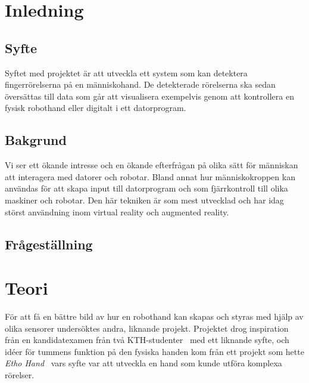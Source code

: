 \documentclass[a4paper]{article}
\begin{document}



\begin{abstract}

\end{abstract}

\begin{otherlanguage}{english}
    \begin{abstract}
    \end{abstract}
\end{otherlanguage}

\tableofcontents

\section{Inledning}
\subsection{Syfte}
Syftet med projektet är att utveckla ett system som kan detektera fingerrörelserna på en människohand.
De detekterade rörelserna ska sedan översättas till data som går att visualisera exempelvis genom att kontrollera en fysisk robothand eller digitalt i ett datorprogram.
\subsection{Bakgrund}
Vi ser ett ökande intresse och en ökande efterfrågan på olika sätt för människan att interagera med datorer och robotar. Bland annat hur människokroppen kan användas för att skapa input till datorprogram och som fjärrkontroll till olika maskiner och robotar.
Den här tekniken är som mest utvecklad och har idag störst användning inom virtual reality och augmented reality.

\subsection{Frågeställning}

\section{Teori}
För att få en bättre bild av hur en robothand kan skapas och styras med hjälp av olika sensorer undersöktes andra, liknande projekt.
Projektet drog inspiration från en kandidatexamen från två KTH-studenter~\cite{KTHhand} med ett liknande syfte, och idéer för tummens funktion på den fysiska handen kom från ett projekt som hette \textit{Etho Hand}~\cite{EthoHand} vars syfte var att utveckla en hand som kunde utföra komplexa rörelser.
\end{document}
